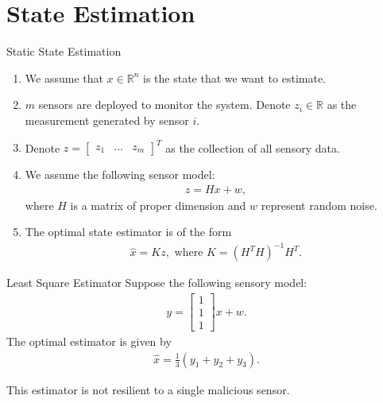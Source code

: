 \documentclass[10pt]{beamer}
\begin{document}
\section{State Estimation}

\begin{frame}{Static State Estimation}
  \begin{enumerate}
  \item We assume that $x \in \mathbb R^n$ is the state that we want to estimate.
  \item $m$ sensors are deployed to monitor the system. Denote $z_i \in \mathbb R$ as the measurement generated by sensor $i$.
  \item Denote $z = \begin{bmatrix}z_1&\dots&z_m\end{bmatrix}^T$ as the collection of all sensory data.
  \item We assume the following sensor model:
    \begin{align*}
      z = Hx + w,
    \end{align*}
    where $H$ is a matrix of proper dimension and $w$ represent random noise.
  \item The optimal state estimator is of the form
    \begin{align*}
      \hat x = Kz, \text{ where }K = (H^TH)^{-1}H^T.
    \end{align*}
  \end{enumerate}
\end{frame}

\begin{frame}{Least Square Estimator}
  Suppose the following sensory model:
  \begin{align*}
    y = \begin{bmatrix}
      1\\
      1\\
      1
    \end{bmatrix}x + w.
  \end{align*}
  The optimal estimator is given by
  \begin{align*}
    \hat x = \frac{1}{3}\left(y_1+y_2+y_3\right).
  \end{align*}
  
  This estimator is not resilient to a single malicious sensor.
\end{frame}
\end{document}
